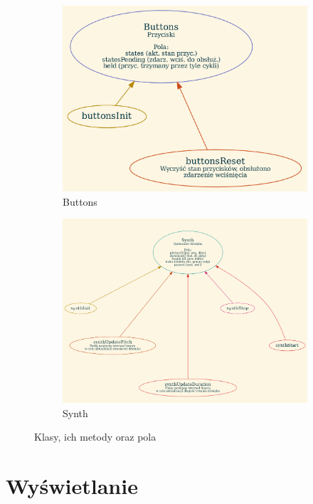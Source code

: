 \documentclass[fleqn]{article}
\begin{document}
\begin{figure}[H]
\begin{subfigure}[b]{0.49\textwidth}
		\includegraphics[width=\textwidth]{assets/g_buttons.png}
		\caption{Buttons}
	\end{subfigure}\hfill
	\begin{subfigure}[b]{0.49\textwidth}
		\includegraphics[width=\textwidth]{assets/g_synth.png}
		\caption{Synth}
	\end{subfigure}
	\caption{Klasy, ich metody oraz pola}
\end{figure}

\pagebreak

\section{Wyświetlanie}
\end{document}
